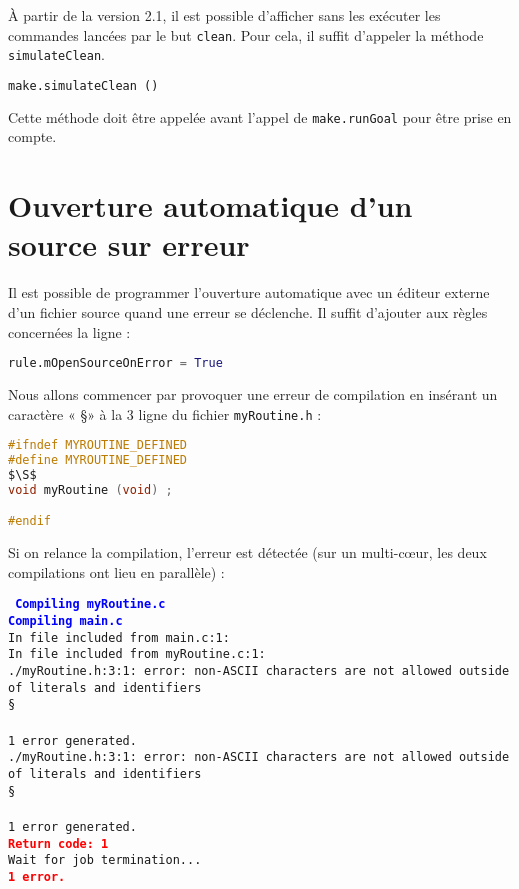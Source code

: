 \documentclass[a4paper,11pt]{extarticle}
\begin{document}
À partir de la version 2.1, il est possible d'afficher sans les exécuter les commandes lancées par le but \texttt{clean}. Pour cela, il suffit d'appeler la méthode \texttt{simulateClean}.

\begin{lstlisting}[language=py]
  make.simulateClean ()
\end{lstlisting}

Cette méthode doit être appelée avant l'appel de \texttt{make.runGoal} pour être prise en compte.



\section{Ouverture automatique d'un source sur erreur}

Il est possible de programmer l'ouverture automatique avec un éditeur externe d'un fichier source quand une erreur se déclenche. Il suffit d'ajouter aux règles concernées la ligne :
\begin{lstlisting}[language=py]
  rule.mOpenSourceOnError = True
\end{lstlisting}


Nous allons commencer par provoquer une erreur de compilation en insérant un caractère « \S » à la 3 ligne du fichier \texttt{myRoutine.h} :
\begin{lstlisting}[mathescape,language=C]
#ifndef MYROUTINE_DEFINED
#define MYROUTINE_DEFINED
$\S$
void myRoutine (void) ;

#endif
\end{lstlisting}

Si on relance la compilation, l'erreur est détectée (sur un multi-cœur, les deux compilations ont lieu en parallèle) :

\begin{mdframed}[hidealllines=true,backgroundcolor=lightgray!20]
\noindent\texttt{\footnotesize
\textcolor{blue}{\bf Compiling myRoutine.c}\\
\textcolor{blue}{\bf Compiling main.c}\\
In file included from main.c:1:\\
In file included from myRoutine.c:1:\\
./myRoutine.h:3:1: error: non-ASCII characters are not allowed outside of literals and identifiers\\
\S\\
\^\\
1 error generated.\\
./myRoutine.h:3:1: error: non-ASCII characters are not allowed outside of literals and identifiers\\
\S\\
\^\\
1 error generated.\\
\textcolor{red}{\bf Return code: 1}\\
Wait for job termination...\\
\textcolor{red}{\bf 1 error.}
}
\end{mdframed}
\end{document}
